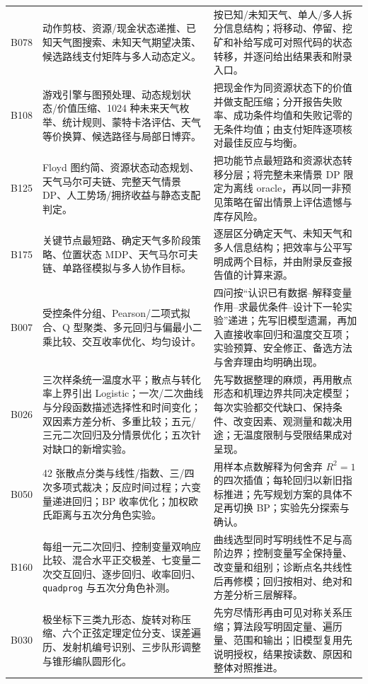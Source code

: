 \begin{longtable}{p{1.4cm}p{5.2cm}p{7.0cm}}
B078 & 动作剪枝、资源/现金状态递推、已知天气图搜索、未知天气期望决策、候选路线支付矩阵与多人动态定义。 &
按已知/未知天气、单人/多人拆分信息结构；将移动、停留、挖矿和补给写成可对照代码的状态转移，并逐问给出结果表和附录入口。\\
B108 & 游戏引擎与图预处理、动态规划状态/价值压缩、1024 种未来天气枚举、统计规则、蒙特卡洛评估、天气等价换算、候选路径与局部日博弈。 &
把现金作为同资源状态下的价值并做支配压缩；分开报告失败率、成功条件均值和失败记零的无条件均值；由支付矩阵逐项核对最佳反应与均衡。\\
B125 & Floyd 图约简、资源状态动态规划、天气马尔可夫链、完整天气情景 DP、人工势场/拥挤收益与静态支配判定。 &
把功能节点最短路和资源状态转移分层；将完整未来情景 DP 限定为离线 oracle，再以同一非预见策略在留出情景上评估遗憾与库存风险。\\
B175 & 关键节点最短路、确定天气多阶段策略、位置状态 MDP、天气马尔可夫链、单路径模拟与多人协作目标。 &
逐层区分确定天气、未知天气和多人信息结构；把效率与公平写明成两个目标，并由附录反查报告值的计算来源。\\
B007 & 受控条件分组、Pearson/二项式拟合、Q 型聚类、多元回归与偏最小二乘比较、交互收率优化、均匀设计。 &
四问按“认识已有数据--解释变量作用--求最优条件--设计下一轮实验”递进；先写旧模型遗漏，再加入直接收率回归和温度交互项；实验预算、安全修正、备选方法与舍弃理由均明确出现。\\
B026 & 三次样条统一温度水平；散点与转化率上界引出 Logistic；一次/二次曲线与分段函数描述选择性和时间变化；双因素方差分析、多重比较；五元/三元二次回归及分情景优化；五次针对缺口的新增实验。 &
先写数据整理的麻烦，再用散点形态和机理边界共同决定模型；每次实验都交代缺口、保持条件、改变因素、观测量和裁决用途；无温度限制与受限结果成对呈现。\\
B050 & 42 张散点分类与线性/指数、三/四次多项式裁决；反应时间过程；六变量递进回归；BP 收率优化；加权欧氏距离与五次分角色实验。 &
用样本点数解释为何舍弃 $R^2=1$ 的四次插值；每轮回归以新旧指标推进；先写规划方案的具体不足再切换 BP；实验先分探索与确认。\\
B160 & 每组一元二次回归、控制变量双响应比较、混合水平正交极差、七变量二次交互回归、逐步回归、收率回归、\texttt{quadprog} 与五次分角色补测。 &
曲线选型同时写明线性不足与高阶边界；控制变量写全保持量、改变量和组别；诊断点名共线性后再修模；回归按相对、绝对和方差分析三层解释。\\
B030 & 极坐标下三类九形态、旋转对称压缩、六个正弦定理定位分支、误差遍历、发射机编号识别、三步队形调整与锥形编队圆形化。 &
先穷尽情形再由可见对称关系压缩；算法段写明固定量、遍历量、范围和输出；旧模型复用先说明授权，结果按读数、原因和整体对照推进。\\

\end{longtable}
